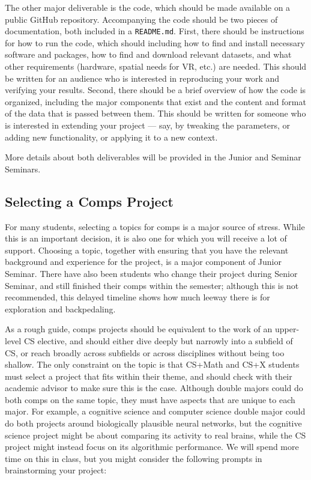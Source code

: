 \documentclass[10pt,twocolumn]{article}
\begin{document}
The other major deliverable is the code, which should be made available on a public GitHub repository.
Accompanying the code should be two pieces of documentation, both included in a \texttt{README.md}.
First, there should be instructions for how to run the code, which should including how to find and install necessary software and packages, how to find and download relevant datasets, and what other requirements (hardware, spatial needs for VR, etc.) are needed.
This should be written for an audience who is interested in reproducing your work and verifying your results.
Second, there should be a brief overview of how the code is organized, including the major components that exist and the content and format of the data that is passed between them.
This should be written for someone who is interested in extending your project --- say, by tweaking the parameters, or adding new functionality, or applying it to a new context.

More details about both deliverables will be provided in the Junior and Seminar Seminars.

\subsection{Selecting a Comps Project}

For many students, selecting a topics for comps is a major source of stress.
While this is an important decision, it is also one for which you will receive a lot of support.
Choosing a topic, together with ensuring that you have the relevant background and experience for the project, is a major component of Junior Seminar.
There have also been students who change their project during Senior Seminar, and still finished their comps within the semester; although this is not recommended, this delayed timeline shows how much leeway there is for exploration and backpedaling.

As a rough guide, comps projects should be equivalent to the work of an upper-level CS elective, and should either dive deeply but narrowly into a subfield of CS, or reach broadly across subfields or across disciplines without being too shallow.
The only constraint on the topic is that CS+Math and CS+X students must select a project that fits within their theme, and should check with their academic advisor to make sure this is the case.
Although double majors could do both comps on the same topic, they must have aspects that are unique to each major.
For example, a cognitive science and computer science double major could do both projects around biologically plausible neural networks, but the cognitive science project might be about comparing its activity to real brains, while the CS project might instead focus on its algorithmic performance.
We will spend more time on this in class, but you might consider the following prompts in brainstorming your project:
\end{document}
